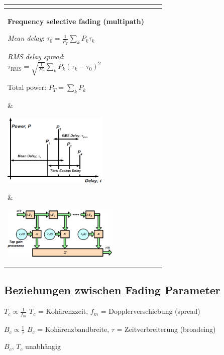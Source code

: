 \begin{tabular}{|lll|}
{        } 
    & \\
\hline
\parbox{7cm}{
	    \textbf{Frequency selective fading (multipath)}
	    \begin{liste}
            \item {\em Mean delay}: $\tau_0=\frac 1{P_T}\sum\limits_k P_k
            \tau_k$
            \item {\em RMS delay spread}:\\
            $\tau_{\text{RMS}}=\sqrt{\frac{1}{P_T}}\sum\limits_k P_k
            (\tau_k-\tau_0)^2$
            \item Total power:
            $P_T=\sum\limits_k P_k$
        \end{liste}
    } 
    & \parbox{5cm}{
        \includegraphics[width=5cm]{./bilder/propagation-frequency-selective-power-delay.png} 
        } 
    & \parbox{5cm}{ 
        \includegraphics[width=5.5cm]{./bilder/propagation-frequency-selective-model.png} 
        } \\
\hline
\end{tabular}

\subsection{Beziehungen zwischen Fading Parameter }
\begin{liste}
    \item $T_c \propto  \frac 1{f_m}$ \qquad $T_c$ = Kohärenzzeit, $f_m$ =
    Dopplerverschiebung (spread)
    \item $B_c \propto \frac 1{\tau}$ \qquad $B_c$ = Kohärenzbandbreite, $\tau$
    = Zeitverbreiterung (broadeing)
    \item $B_c$, $T_c$ unabhängig
\end{liste}
